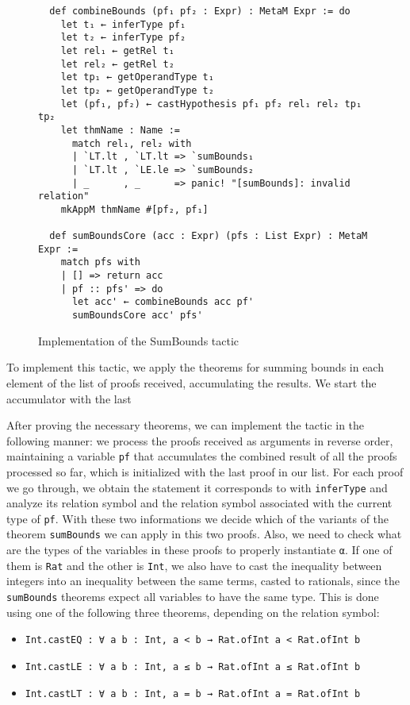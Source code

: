 \begin{figure}[t]
\begin{verbatim}
  def combineBounds (pf₁ pf₂ : Expr) : MetaM Expr := do
    let t₁ ← inferType pf₁
    let t₂ ← inferType pf₂
    let rel₁ ← getRel t₁
    let rel₂ ← getRel t₂
    let tp₁ ← getOperandType t₁
    let tp₂ ← getOperandType t₂
    let (pf₁, pf₂) ← castHypothesis pf₁ pf₂ rel₁ rel₂ tp₁ tp₂
    let thmName : Name :=
      match rel₁, rel₂ with
      | `LT.lt , `LT.lt => `sumBounds₁
      | `LT.lt , `LE.le => `sumBounds₂
      | _      , _      => panic! "[sumBounds]: invalid relation"
    mkAppM thmName #[pf₂, pf₁]

  def sumBoundsCore (acc : Expr) (pfs : List Expr) : MetaM Expr :=
    match pfs with
    | [] => return acc
    | pf :: pfs' => do
      let acc' ← combineBounds acc pf'
      sumBoundsCore acc' pfs'
\end{verbatim}
\caption{Implementation of the SumBounds tactic}
\end{figure}

To implement this tactic, we apply the theorems for summing bounds in each element
of the list of proofs received, accumulating the results. We start the accumulator
with the last

After proving the necessary theorems, we can implement the tactic in the following manner:
we process the proofs received as arguments in reverse order, maintaining a variable \texttt{pf}
that accumulates the combined result of all the proofs processed so far, which is initialized
with the last proof in our list. For each proof we go through, we obtain the statement it corresponds to
with \texttt{inferType} and analyze its relation symbol and the relation symbol associated with the
current type of \texttt{pf}. With these two informations we decide which of the variants of the theorem
\texttt{sumBounds} we can apply in this two proofs. Also, we need to check what are the types of the
variables in these proofs to properly instantiate \texttt{α}. If one of them is \texttt{Rat} and the
other is \texttt{Int}, we also have to cast the inequality between integers into
an inequality between the same terms, casted to rationals, since the \texttt{sumBounds} theorems expect all variables to have the same type. This is done using one of the
following three theorems, depending on the relation symbol:

\begin{itemize}
  \item \texttt{Int.castEQ : ∀ {a b : Int}, a < b → Rat.ofInt a < Rat.ofInt b}
  \item \texttt{Int.castLE : ∀ {a b : Int}, a ≤ b → Rat.ofInt a ≤ Rat.ofInt b}
  \item \texttt{Int.castLT : ∀ {a b : Int}, a = b → Rat.ofInt a = Rat.ofInt b}
\end{itemize}

